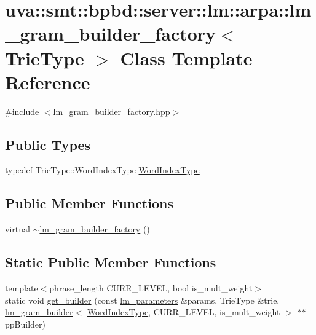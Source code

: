 \hypertarget{classuva_1_1smt_1_1bpbd_1_1server_1_1lm_1_1arpa_1_1lm__gram__builder__factory}{}\section{uva\+:\+:smt\+:\+:bpbd\+:\+:server\+:\+:lm\+:\+:arpa\+:\+:lm\+\_\+gram\+\_\+builder\+\_\+factory$<$ Trie\+Type $>$ Class Template Reference}
\label{classuva_1_1smt_1_1bpbd_1_1server_1_1lm_1_1arpa_1_1lm__gram__builder__factory}


{\ttfamily \#include $<$lm\+\_\+gram\+\_\+builder\+\_\+factory.\+hpp$>$}

\subsection*{Public Types}
\begin{DoxyCompactItemize}
\item 
typedef Trie\+Type\+::\+Word\+Index\+Type \hyperlink{classuva_1_1smt_1_1bpbd_1_1server_1_1lm_1_1arpa_1_1lm__gram__builder__factory_a9ed42c203e3aa56e33abe6f6462e86a6}{Word\+Index\+Type}
\end{DoxyCompactItemize}
\subsection*{Public Member Functions}
\begin{DoxyCompactItemize}
\item 
virtual \hyperlink{classuva_1_1smt_1_1bpbd_1_1server_1_1lm_1_1arpa_1_1lm__gram__builder__factory_a507840e7cc154fb2e77a9cd3eb61ca4d}{$\sim$lm\+\_\+gram\+\_\+builder\+\_\+factory} ()
\end{DoxyCompactItemize}
\subsection*{Static Public Member Functions}
\begin{DoxyCompactItemize}
\item 
{\footnotesize template$<$phrase\+\_\+length C\+U\+R\+R\+\_\+\+L\+E\+V\+E\+L, bool is\+\_\+mult\+\_\+weight$>$ }\\static void \hyperlink{classuva_1_1smt_1_1bpbd_1_1server_1_1lm_1_1arpa_1_1lm__gram__builder__factory_add337d3ee22e1d0e2538cd47ea7185df}{get\+\_\+builder} (const \hyperlink{structuva_1_1smt_1_1bpbd_1_1server_1_1lm_1_1lm__parameters}{lm\+\_\+parameters} \&params, Trie\+Type \&trie, \hyperlink{classuva_1_1smt_1_1bpbd_1_1server_1_1lm_1_1arpa_1_1lm__gram__builder}{lm\+\_\+gram\+\_\+builder}$<$ \hyperlink{classuva_1_1smt_1_1bpbd_1_1server_1_1lm_1_1arpa_1_1lm__gram__builder__factory_a9ed42c203e3aa56e33abe6f6462e86a6}{Word\+Index\+Type}, C\+U\+R\+R\+\_\+\+L\+E\+V\+E\+L, is\+\_\+mult\+\_\+weight $>$ $\ast$$\ast$pp\+Builder)
\end{DoxyCompactItemize}


